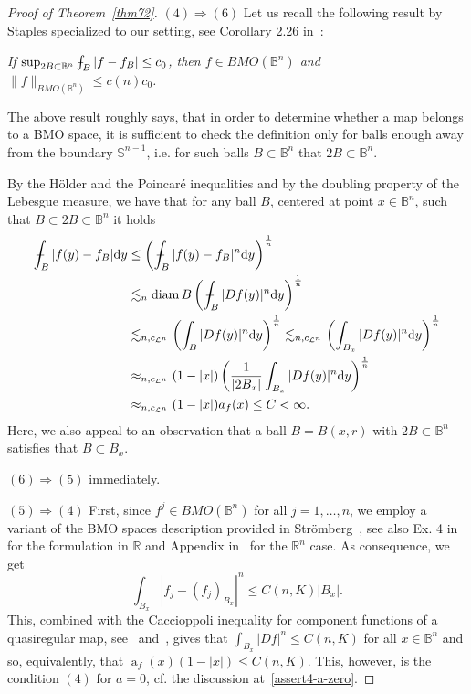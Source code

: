 \documentclass[11pt,a4paper,reqno]{amsart}
\theoremstyle{definition}
\def\vint{\mathop{\mathchoice%
          {\setbox0\hbox{$\displaystyle\intop$}\kern 0.22\wd0%
           \vcenter{\hrule width 0.6\wd0}\kern -0.82\wd0}%
          {\setbox0\hbox{$\textstyle\intop$}\kern 0.2\wd0%
           \vcenter{\hrule width 0.6\wd0}\kern -0.8\wd0}%
          {\setbox0\hbox{$\scriptstyle\intop$}\kern 0.2\wd0%
           \vcenter{\hrule width 0.6\wd0}\kern -0.8\wd0}%
          {\setbox0\hbox{$\scriptscriptstyle\intop$}\kern 0.2\wd0%
           \vcenter{\hrule width 0.6\wd0}\kern -0.8\wd0}}%
          \mathopen{}\int}
\renewcommand{\a}{\operatorname{a}}
\newcommand{\B}{\mathbb{B}^n}
\newcommand{\R}{\mathbb{R}}
\newcommand{\Rn}{{\mathbb R}^n}
\newcommand{\ud}{\mathrm {d}}
\newcommand{\diam}{\operatorname{diam}}
\newcommand{\Sn}{\mathbb{S}^{n-1}}
\numberwithin{komcounter}{section}
\begin{document}
\begin{proof}[Proof of Theorem~\ref{thm72}]
\noindent $(4)\Rightarrow (6)$ Let us recall the following result by Staples specialized to our setting, see Corollary 2.26 in~\cite{st}:
\medskip

\emph{If $\sup_{2B\subset \B} \vint_{B}|f-f_{B}| \leq c_0$, then $f\in BMO(\B)$ and $\|f\|_{BMO(\B)}\leq c(n) c_0$.
}
\medskip

\noindent The above result roughly says, that in order to determine whether a map belongs to a BMO space, it is sufficient to check the definition only for balls enough away from the boundary $\Sn$, i.e. for such balls $B\subset \B$ that $2B\subset \B$. 

By the H\"older and the Poincar\'e inequalities and by the doubling property of the Lebesgue measure, we have that for any ball $B$, centered at point $x\in \B$, such that $B\subset 2B\subset \B$ it holds 
\begin{align*}
\vint_{B}|f(y)-f_{B}|\ud y &\leq  \left(\vint_{B}|f(y)-f_{B}|^n\ud y\right)^{\frac1n} \\
&\lesssim_{n}   \diam B \left(\vint_{B} |Df(y)|^n\ud y\right)^{\frac1n} \\
&\lesssim_{n, c_{\mathcal{L}^n}} \left(\int_{B} |Df(y)|^n\ud y\right)^{\frac1n} \lesssim_{n, c_{\mathcal{L}^n}} \left(\int_{B_x} |Df(y)|^n\ud y\right)^{\frac1n} \\
& \approx_{n, c_{\mathcal{L}^n}} (1-|x| )\left(\frac{1}{|2B_x|} \int_{B_x} |Df(y)|^n\ud y\right)^{\frac1n} \\
& \approx_{n, c_{\mathcal{L}^n}} (1-|x|) a_f(x) \leq C <\infty.
\end{align*}
Here, we also appeal to an observation that a ball $B=B(x,r)$ with $2B\subset \B$ satisfies that $B\subset B_x$.

\noindent $(6)\Rightarrow (5)$ immediately.
\smallskip

\noindent $(5)\Rightarrow (4)$ %
First, since $f^j\in BMO(\B)$ for all $j=1,\ldots, n$, we employ a variant of the BMO spaces description provided in 
Str\"omberg~\cite{str}, see also Ex. 4 in~\cite[pg.  261, Ch VI]{g} for the formulation in $\R$ and Appendix in~\cite{agg} for the $\Rn$ case. As consequence, we get
\[
 \int_{B_x} |f_j-(f_j)_{B_x}|^n \leq C(n, K) |B_x|.
\]
This, combined with the Caccioppoli inequality for component functions of a quasiregular map, see~\cite[Proposition 2.6]{no} and~\cite[Formula (5.3)]{in}, gives that $\int_{B_x} |Df|^n\leq C(n, K)$ for all $x\in \B$ and so, equivalently, that
$\a_f(x)(1-|x|)\leq C(n, K)$. This, however, is the condition $(4)$ for $a=0$, cf. the discussion at~\eqref{assert4-a-zero}.
\end{proof}
\end{document}

